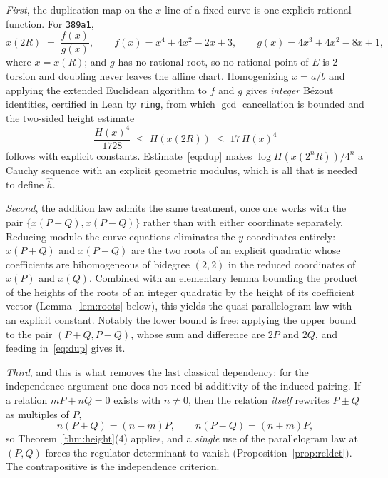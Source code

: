 \documentclass[11pt,reqno]{amsart}
\theoremstyle{plain}
\theoremstyle{definition}
\theoremstyle{remark}
\DeclareRobustCommand{\lt}[1]{\texttt{#1}}
\newcommand{\hh}{\widehat{h}}
\newcommand{\nh}{H}
\begin{document}
\emph{First}, the duplication map on the $x$-line of a fixed curve is one
explicit rational function. For \texttt{389a1},
\begin{equation}\label{eq:fg}
  x(2R) \;=\; \frac{f(x)}{g(x)}, \qquad
  f(x) = x^4 + 4x^2 - 2x + 3, \qquad
  g(x) = 4x^3 + 4x^2 - 8x + 1,
\end{equation}
where $x = x(R)$; and $g$ has no rational root, so no rational point of
$E$ is $2$-torsion and doubling never leaves the affine chart. Homogenizing
$x = a/b$ and applying the extended Euclidean algorithm to $f$ and $g$ gives
\emph{integer} B\'ezout identities, certified in Lean by \lt{ring}, from which
$\gcd$ cancellation is bounded and the two-sided height estimate
\begin{equation}\label{eq:dup}
  \frac{\nh(x)^4}{1728} \;\le\; \nh\!\left(x(2R)\right) \;\le\; 17\,\nh(x)^4
\end{equation}
follows with explicit constants. Estimate~\eqref{eq:dup} makes
$\log \nh(x(2^nR))/4^n$ a Cauchy sequence with an explicit geometric modulus,
which is all that is needed to define $\hh$.

\emph{Second}, the addition law admits the same treatment, once one works with
the pair $\{x(P+Q), x(P-Q)\}$ rather than with either coordinate separately.
Reducing modulo the curve equations eliminates the $y$-coordinates entirely:
$x(P+Q)$ and $x(P-Q)$ are the two roots of an explicit quadratic whose
coefficients are bihomogeneous of bidegree $(2,2)$ in the reduced coordinates
of $x(P)$ and $x(Q)$. Combined with an elementary lemma bounding the product
of the heights of the roots of an integer quadratic by the height of its
coefficient vector (Lemma~\ref{lem:roots} below), this yields the
quasi-parallelogram law with an explicit constant. Notably the lower bound is
free: applying the upper bound to the pair $(P+Q, P-Q)$, whose sum and
difference are $2P$ and $2Q$, and feeding in~\eqref{eq:dup} gives it.

\emph{Third}, and this is what removes the last classical dependency: for the
independence argument one does not need bi-additivity of the induced pairing.
If a relation $mP + nQ = 0$ exists with $n \ne 0$, then the relation
\emph{itself} rewrites $P \pm Q$ as multiples of $P$,
\[
  n(P+Q) = (n-m)P, \qquad n(P-Q) = (n+m)P,
\]
so Theorem~\ref{thm:height}(4) applies, and a \emph{single} use of the
parallelogram law at $(P,Q)$ forces the regulator determinant to vanish
(Proposition~\ref{prop:reldet}). The contrapositive is the independence
criterion.
\end{document}
